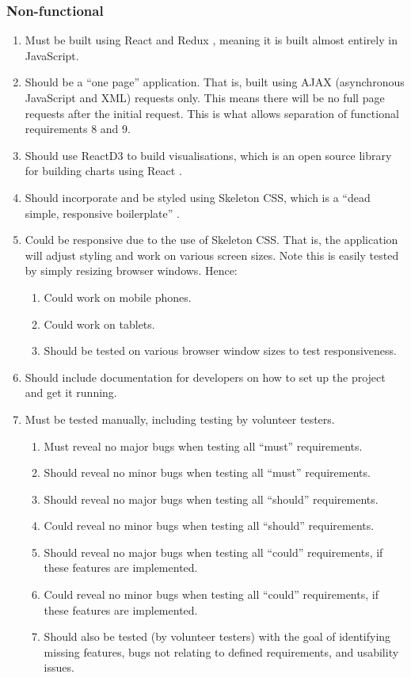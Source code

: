 \documentclass[11pt,openright,a4paper]{report}
\begin{document}
\subsubsection{Non-functional}
\begin{enumerate}
\item Must be built using React \parencite{react} and Redux \parencite{redux}, meaning it is built almost entirely in JavaScript.
\item Should be a \enquote{one page} application. That is, built using AJAX (asynchronous JavaScript and XML) requests only. This means there will be no full page requests after the initial request. This is what allows separation of functional requirements 8 and 9.
\item Should use ReactD3 to build visualisations, which is an open source library for building charts using React \parencite{reactd3}.
\item Should incorporate and be styled using Skeleton CSS, which is a \enquote{dead simple, responsive boilerplate} \parencite{skeletoncss}.
\item Could be responsive due to the use of Skeleton CSS. That is, the application will adjust styling and work on various screen sizes. Note this is easily tested by simply resizing browser windows. Hence:
  \begin{enumerate}
  \item Could work on mobile phones.
  \item Could work on tablets.
  \item Should be tested on various browser window sizes to test responsiveness.
  \end{enumerate}
\item Should include documentation for developers on how to set up the project and get it running.
\item Must be tested manually, including testing by volunteer testers.
  \begin{enumerate}
  \item Must reveal no major bugs when testing all \enquote{must} requirements.
  \item Should reveal no minor bugs when testing all \enquote{must} requirements.
  \item Should reveal no major bugs when testing all \enquote{should} requirements.
  \item Could reveal no minor bugs when testing all \enquote{should} requirements.
  \item Should reveal no major bugs when testing all \enquote{could} requirements, if these features are implemented.
  \item Could reveal no minor bugs when testing all \enquote{could} requirements, if these features are implemented.
  \item Should also be tested (by volunteer testers) with the goal of identifying missing features, bugs not relating to defined requirements, and usability issues.
  \end{enumerate}
\end{enumerate}
\end{document}
